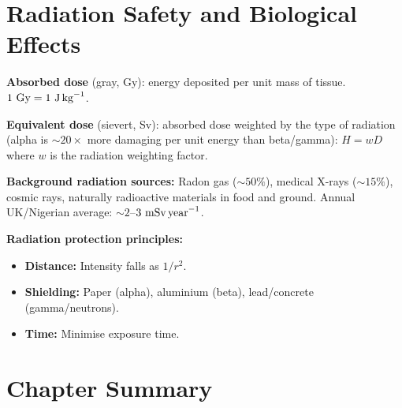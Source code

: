 \section{Radiation Safety and Biological Effects}

\begin{defbox}
\textbf{Absorbed dose} (gray, Gy):
energy deposited per unit mass of tissue.
$1\ \text{Gy} = 1\ \text{J\,kg}^{-1}$.

\textbf{Equivalent dose} (sievert, Sv):
absorbed dose weighted by the type of radiation
(alpha is $\sim 20\times$ more damaging per unit
energy than beta/gamma):
$H = wD$ where $w$ is the radiation weighting factor.

\textbf{Background radiation sources:}
Radon gas ($\sim 50\%$), medical X-rays ($\sim 15\%$),
cosmic rays, naturally radioactive materials in
food and ground. Annual UK/Nigerian average:
$\sim 2$--$3\ \text{mSv\,year}^{-1}$.

\textbf{Radiation protection principles:}
\begin{itemize}[noitemsep]
  \item \textbf{Distance:} Intensity falls as $1/r^2$.
  \item \textbf{Shielding:} Paper (alpha), aluminium
  (beta), lead/concrete (gamma/neutrons).
  \item \textbf{Time:} Minimise exposure time.
\end{itemize}
\end{defbox}

\section{Chapter Summary}

